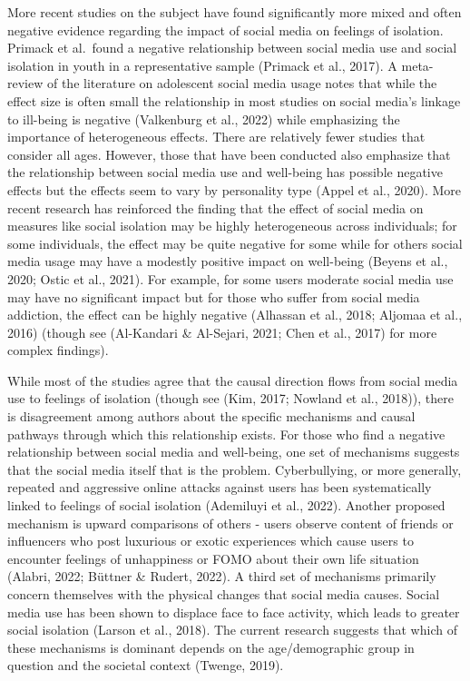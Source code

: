 \documentclass[
  letterpaper,
  DIV=11,
  numbers=noendperiod]{scrartcl}
\begin{document}
More recent studies on the subject have found significantly more mixed
and often negative evidence regarding the impact of social media on
feelings of isolation. Primack et al.~found a negative relationship
between social media use and social isolation in youth in a
representative sample (Primack et al., 2017). A meta-review of the
literature on adolescent social media usage notes that while the effect
size is often small the relationship in most studies on social media's
linkage to ill-being is negative (Valkenburg et al., 2022) while
emphasizing the importance of heterogeneous effects. There are
relatively fewer studies that consider all ages. However, those that
have been conducted also emphasize that the relationship between social
media use and well-being has possible negative effects but the effects
seem to vary by personality type (Appel et al., 2020). More recent
research has reinforced the finding that the effect of social media on
measures like social isolation may be highly heterogeneous across
individuals; for some individuals, the effect may be quite negative for
some while for others social media usage may have a modestly positive
impact on well-being (Beyens et al., 2020; Ostic et al., 2021). For
example, for some users moderate social media use may have no
significant impact but for those who suffer from social media addiction,
the effect can be highly negative (Alhassan et al., 2018; Aljomaa et
al., 2016) (though see (Al-Kandari \& Al-Sejari, 2021; Chen et al.,
2017) for more complex findings).

While most of the studies agree that the causal direction flows from
social media use to feelings of isolation (though see (Kim, 2017;
Nowland et al., 2018)), there is disagreement among authors about the
specific mechanisms and causal pathways through which this relationship
exists. For those who find a negative relationship between social media
and well-being, one set of mechanisms suggests that the social media
itself that is the problem. Cyberbullying, or more generally, repeated
and aggressive online attacks against users has been systematically
linked to feelings of social isolation (Ademiluyi et al., 2022). Another
proposed mechanism is upward comparisons of others - users observe
content of friends or influencers who post luxurious or exotic
experiences which cause users to encounter feelings of unhappiness or
FOMO about their own life situation (Alabri, 2022; Büttner \& Rudert,
2022). A third set of mechanisms primarily concern themselves with the
physical changes that social media causes. Social media use has been
shown to displace face to face activity, which leads to greater social
isolation (Larson et al., 2018). The current research suggests that
which of these mechanisms is dominant depends on the age/demographic
group in question and the societal context (Twenge, 2019).
\end{document}
